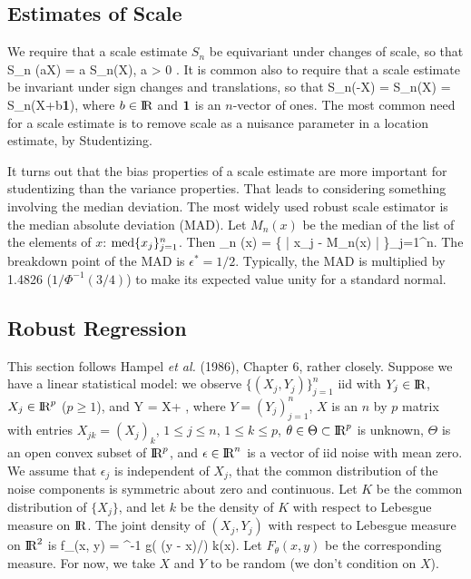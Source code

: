 \subsection{Estimates of Scale}
We require that a scale estimate $S_n$ be equivariant under changes of scale, so that
\beq
    S_n (aX) = a S_n(X), \;\; \forall a > 0 .
\eeq
It is common also to require that a scale estimate be invariant under sign
changes and translations, so that
\beq
    S_n(-X) = S_n(X) = S_n(X+b{\bf 1}),
\eeq
where $b \in \hbox{I\kern-.17em\hbox{R}}$ and ${\bf 1}$ is an $n$-vector of ones.
The most common need for a scale estimate is to remove scale as a nuisance
parameter in a location estimate, by Studentizing.

It turns out that the bias properties of a scale estimate are more important for
studentizing than the variance properties. That leads to considering something
involving the median deviation.
The most widely used robust scale estimator is
the median absolute deviation (MAD).
Let $M_n(x)$ be the median of the list of the elements
of $x$: ${\rm med}\{x_j\}_{j=1}^n$.
Then
\beq
    \MAD_n (x) = \med \{ | x_j - M_n(x) | \}_{j=1}^n.
\eeq
The breakdown point of the MAD is $\epsilon^* = 1/2$.
Typically, the MAD is multiplied by 1.4826 ($1/\Phi^{-1}(3/4)$)
to make its expected value unity for a standard normal.


\subsection{Robust Regression}
This section follows Hampel {\em et al.\/} (1986), Chapter 6, rather closely.
Suppose we have a linear statistical model: we observe $\{(X_j, Y_j)\}_{j=1}^n$
iid with $Y_j \in \hbox{I\kern-.17em\hbox{R}}$, $X_j \in \hbox{I\kern-.17em\hbox{R}}^p$ ($p \ge 1$), and
\beq
    Y = X\theta + \epsilon,
\eeq
where $Y = (Y_j)_{j=1}^n$, $X$ is an $n$ by $p$ matrix with entries
$X_{jk} = (X_j)_k$, $1 \le j \le n$, $1 \le k \le p$,
$\theta \in \Theta \subset \hbox{I\kern-.17em\hbox{R}}^p$ is unknown, $\Theta$ is an open convex subset of
$\hbox{I\kern-.17em\hbox{R}}^p$, and $\epsilon \in \hbox{I\kern-.17em\hbox{R}}^n$ is a
vector of iid noise with mean zero.
We assume that $\epsilon_j$ is independent of $X_j$, that the common distribution
of the noise components is symmetric about zero and continuous.
Let $K$ be the common distribution of $\{X_j\}$, and let $k$ be the density of $K$
with respect to Lebesgue measure on $\hbox{I\kern-.17em\hbox{R}}$.
The joint density of $(X_j, Y_j)$ with respect to Lebesgue measure on $\hbox{I\kern-.17em\hbox{R}}^2$ is
\beq
    f_\theta(x, y) = \sigma^{-1} g\left ( (y - x\theta)/\sigma\right ) k(x).
\eeq
Let $F_\theta(x, y)$ be the corresponding measure.
For now, we take $X$ and $Y$ to be random (we don't condition on $X$).

